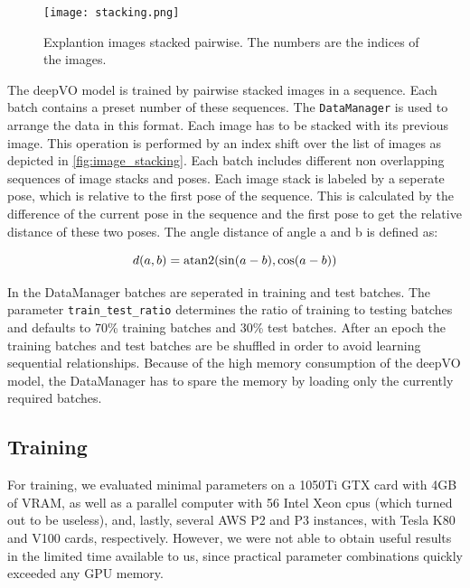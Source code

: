 \documentclass[a4paper,11pt]{article}
\begin{document}
\begin{figure}[tbh]
    \centering
    \texttt{[image: stacking.png]}
    \caption{Explantion images stacked pairwise. The numbers are the indices of the images.}
    \label{fig:image_stacking}
\end{figure}
The deepVO model is trained by pairwise stacked images in a sequence. Each batch contains a preset number of these sequences. The \texttt{DataManager} is used to arrange the data in this format. Each image has to be stacked with its previous image. This operation is performed by an index shift over the list of images as depicted in \autoref{fig:image_stacking}. Each batch includes different non overlapping sequences of image stacks and
poses. Each image stack is labeled by a seperate pose, which is relative to the
first pose of the sequence. 
This is calculated by the difference of the current pose in the sequence and the first pose to get the relative distance of these two poses. The angle distance of angle a and b is defined as:

\begin{equation}
 d(a,b) = \operatorname{atan2}(\sin(a-b), \cos(a-b))
\end{equation}

In the DataManager batches are seperated in training and test batches. The
parameter \texttt{train\_test\_ratio} determines the ratio of training to testing
batches and defaults to 70\% training batches and 30\% test batches. After an
epoch the training batches and test batches are be shuffled in order to avoid learning
sequential relationships. Because of the high memory consumption of the deepVO model, 
the DataManager has to spare the memory by loading only the currently required batches.


\subsection{Training}
\label{sec:evaluation:training}

For training, we evaluated minimal parameters on a 1050Ti GTX card with 4GB of
VRAM, as well as a parallel computer with 56 Intel Xeon cpus (which turned out
to be useless), and, lastly, several AWS P2 and P3 instances, with Tesla K80 and
V100 cards, respectively. However, we were not able to obtain useful results in
the limited time available to us, since practical parameter combinations quickly
exceeded any GPU memory.
\end{document}
